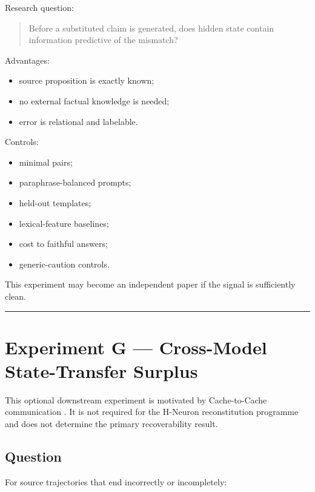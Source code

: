 Research question:

\begin{quote}
Before a substituted claim is generated, does hidden state contain information predictive of the mismatch?
\end{quote}

Advantages:

\begin{itemize}
\tightlist
\item
  source proposition is exactly known;
\item
  no external factual knowledge is needed;
\item
  error is relational and labelable.
\end{itemize}

Controls:

\begin{itemize}
\tightlist
\item
  minimal pairs;
\item
  paraphrase-balanced prompts;
\item
  held-out templates;
\item
  lexical-feature baselines;
\item
  cost to faithful answers;
\item
  generic-caution controls.
\end{itemize}

This experiment may become an independent paper if the signal is sufficiently clean.

\begin{center}\rule{0.5\linewidth}{0.5pt}\end{center}

\section{Experiment G --- Cross-Model State-Transfer Surplus}\label{experiment-g-cache-transfer}

This optional downstream experiment is motivated by Cache-to-Cache communication \autocite{fu2026c2c}. It is not required for the H-Neuron reconstitution programme and does not determine the primary recoverability result.

\subsection{Question}\label{cache-transfer-question}

For source trajectories that end incorrectly or incompletely:

